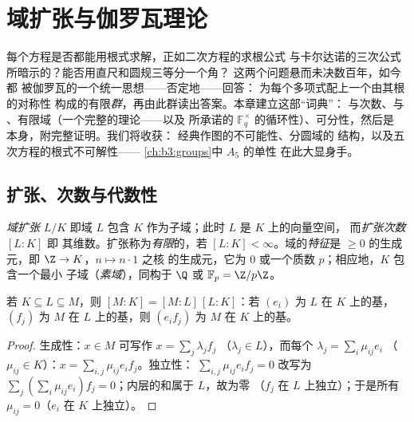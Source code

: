 \chapter{域扩张与伽罗瓦理论}\label{ch:b3:galois}

每个方程是否都能用根式求解，正如二次方程的求根公式
与卡尔达诺的三次公式所暗示的？能否用直尺和圆规三等分一个角？
这两个问题悬而未决数百年，如今都
被伽罗瓦的一个统一思想——否定地——回答：
为每个多项式配上一个由其根的对称性
构成的有限\emph{群}，再由此群读出答案。本章建立这部“词典”：
与次数、与
、有限域（一个完整的理论——以及
所承诺的 $\mathbb F_q^\times$ 的循环性）、可分性，然后是
本身，附完整证明。我们将收获：
经典作图的不可能性、分圆域的
结构，以及五次方程的根式不可解性——
\cref{ch:b3:groups}中 $A_5$ 的单性
在此大显身手。

\section{扩张、次数与代数性}

\begin{definition}\label{def:b3:galois:extension}
\emph{域扩张} $L/K$ 即域
$L$ 包含 $K$ 作为子域；此时 $L$ 是 $K$ 上的向量空间，
而\emph{扩张次数} $[L:K]$ 即
其维数。扩张称为\emph{有限}的，若 $[L:K] <
\infty$。域的\emph{特征}是
$\geq 0$ 的生成元，即 $\Z \to K$，$n \mapsto n\cdot 1$ 之核
的生成元，它为 $0$ 或一个质数 $p$；相应地，$K$ 包含一个最小
子域（\emph{素域}），同构于 $\Q$ 或 $\mathbb
F_p = \Z/p\Z$。
\end{definition}

\begin{theorem}[塔律]\label{thm:b3:galois:tower}
若 $K \subseteq L \subseteq M$，则 $[M:K] = [M:L]\,[L:K]$：若
$(e_i)$ 为 $L$ 在 $K$ 上的基，$(f_j)$ 为 $M$ 在
$L$ 上的基，则 $(e_if_j)$ 为 $M$ 在
$K$ 上的基。
\end{theorem}

\begin{proof}
生成性：$x \in M$ 可写作 $x = \sum_j \lambda_jf_j$
（$\lambda_j \in L$），而每个 $\lambda_j = \sum_i \mu_{ij}e_i$
（$\mu_{ij} \in K$）：$x = \sum_{i,j}\mu_{ij}e_if_j$。独立性：
$\sum_{i,j}\mu_{ij}e_if_j = 0$ 改写为 $\sum_j (\sum_i
\mu_{ij}e_i)f_j = 0$；内层的和属于 $L$，故为零
（$f_j$ 在 $L$ 上独立）；于是所有 $\mu_{ij} = 0$（$e_i$
在 $K$ 上独立）。
\end{proof}


